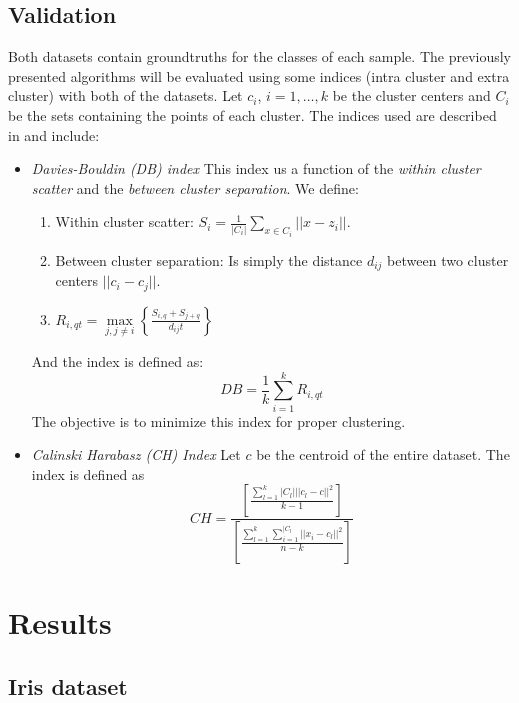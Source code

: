 \documentclass[conference]{IEEEtran}
\begin{document}
\subsection{Validation}
Both datasets contain groundtruths for the classes of each sample. The previously presented algorithms will be evaluated using some indices (intra cluster and extra cluster) with both of the datasets. Let $c_i$, $i = 1,\dots, k$ be the cluster centers and $C_i$ be the sets containing the points of each cluster. The indices used are described in \cite{validation} and include:
\begin{itemize}
    \item \textit{Davies-Bouldin (DB) index} This index us a function of the \textit{within cluster scatter} and the \textit{between cluster separation}. We define:
    \begin{enumerate}
        \item Within cluster scatter: $S_i = \displaystyle{\frac{1}{|C_i|}\sum_{x\in C_i}||x - z_i||}$.
        \item Between cluster separation: Is simply the distance $d_{ij}$ between two cluster centers $||c_i-c_j||$.
        \item $\displaystyle{R_{i,qt} = \max\limits_{j,j\neq i}\left\lbrace\frac{S_{i,q} + S_{j+q}}{d_{ij}t}\right\rbrace}$
    \end{enumerate}
    And the index is defined as:
    \begin{equation*}
        DB = \frac{1}{k}\sum_{i=1}^k R_{i,qt}
    \end{equation*}
    The objective is to minimize this index for proper clustering.
    \item \textit{Calinski Harabasz (CH) Index} Let $c$ be the centroid of the entire dataset. The index is defined as
    \begin{equation*}
        CH = \frac{ \left[\frac{\sum_{l = 1}^k |C_l|||c_l - c||^2}{k-1}\right]}{\left[\frac{\sum_{l=1}^k \sum_{i=1}^{|C_l}||x_i-c_l||^2}{n-k}\right]}
    \end{equation*}
\end{itemize}

\section{Results}
\subsection{Iris dataset}
\end{document}
